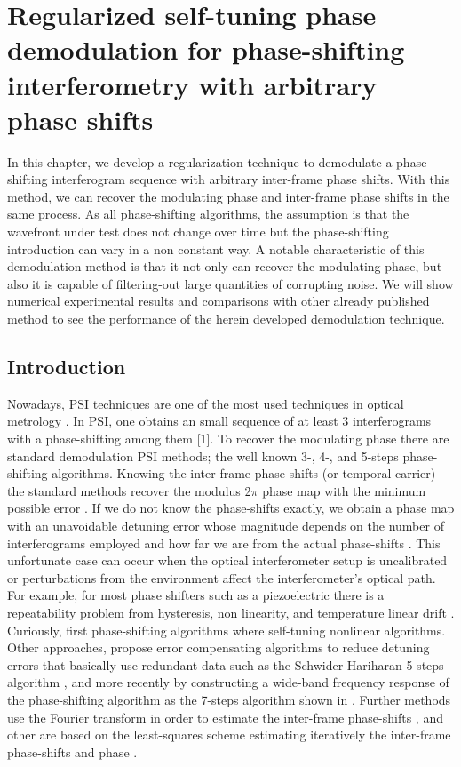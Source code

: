 \chapter{Regularized self-tuning phase demodulation for phase-shifting
interferometry with arbitrary phase shifts}

In this chapter, we develop a regularization technique to demodulate
a phase-shifting interferogram sequence with arbitrary inter-frame
phase shifts. With this method, we can recover the modulating phase
and inter-frame phase shifts in the same process. As all phase-shifting
algorithms, the assumption is that the wavefront under test does not
change over time but the phase-shifting introduction can vary in a
non constant way. A notable characteristic of this demodulation method
is that it not only can recover the modulating phase, but also it
is capable of filtering-out large quantities of corrupting noise.
We will show numerical experimental results and comparisons with other
already published method to see the performance of the herein developed
demodulation technique.

\section{Introduction}

Nowadays, PSI techniques are one of
the most used techniques in optical metrology \cite{Malacara}. In PSI, one
obtains an small sequence of at least 3 interferograms with a phase-shifting
among them {[}1{]}. To recover the modulating phase there are standard
demodulation PSI methods; the well known 3-, 4-, and 5-steps phase-shifting
algorithms. Knowing the inter-frame phase-shifts (or temporal carrier)
the standard methods recover the modulus 2$\pi$ phase map with the
minimum possible error \cite{Malacara,Freischlad:90,Servin:09}. If we
do not know the phase-shifts exactly, we obtain a phase map with an
unavoidable detuning error whose magnitude depends on the number of
interferograms employed and how far we are from the actual phase-shifts
\cite{Servin:09,Schwider:83,Ai:87,Larkin:01,Langoju:06}. This unfortunate case
can occur when the optical
interferometer setup is uncalibrated or perturbations from the environment
affect the interferometer\textquoteright{}s optical path. For example,
for most phase shifters such as a piezoelectric there is a repeatability 
problem from hysteresis, non linearity, and temperature linear drift
\cite{Ai:87,Cheng:85}.
Curiously, first phase-shifting algorithms where self-tuning nonlinear
algorithms. Other approaches, propose error compensating
algorithms to reduce detuning errors that basically use redundant
data such as the Schwider-Hariharan 5-steps algorithm
\cite{Schwider:83,Hariharan:87,Surrel:93},
and more recently by constructing a wide-band frequency response of
the phase-shifting algorithm as the 7-steps algorithm shown in
\cite{Estrada:09}.
Further methods use the Fourier transform in order to estimate the
inter-frame phase-shifts \cite{Larkin:01,Lai:91}, and other are based on the
least-squares scheme estimating iteratively the inter-frame phase-shifts
and phase \cite{Kong,Wang:04}.

